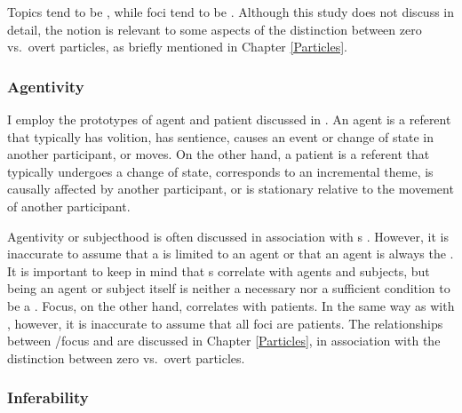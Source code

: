 Topics tend to be ,
while foci tend to be  \cite{givon76,keenan76,comrie79,comrie83,dubois87}.
Although this study does not discuss  in detail,
the notion is relevant to some aspects of the distinction between
zero vs.\ overt particles,
as briefly mentioned in Chapter \ref{Particles}.


\subsubsection{Agentivity}

I employ the prototypes of agent and patient
discussed in .
An agent is a referent
that typically has volition,
has sentience,
causes an event or change of state in another participant, or
moves.
On the other hand,
a patient is a referent
that typically undergoes a change of state,
corresponds to an incremental theme,
is causally affected by another participant, or
is stationary relative to the movement of another participant.

Agentivity or subjecthood is often discussed in association with s \cite[][inter alia]{li76}.
However, it is inaccurate to assume that a  is limited to an agent
or that an agent is always the .
It is important to keep in mind that
s correlate with agents and subjects,
but being an agent or subject itself is neither a necessary nor a sufficient condition to be a .
Focus, on the other hand, correlates with patients.
In the same way as with , however,
it is inaccurate to assume that all foci are patients.
The relationships between /focus and  are discussed in Chapter \ref{Particles},
in association with the distinction between zero vs.\ overt particles.


\subsubsection{Inferability}


